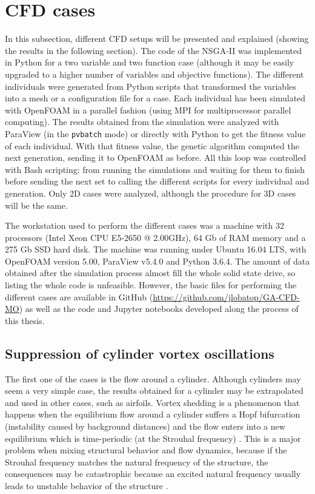 \newpage

\section{CFD cases}

In this subsection, different CFD setups will be presented and explained (showing the results in the following section). The code of the NSGA-II was implemented in Python for a two variable and two function case (although it may be easily upgraded to a higher number of variables and objective functions). The different individuals were generated from Python scripts that transformed the variables into a mesh or a configuration file for a case. Each individual has been simulated with OpenFOAM in a parallel fashion (using MPI for multiprocessor parallel computing). The results obtained from the simulation were analyzed with ParaView (in the \texttt{pvbatch} mode) or directly with Python to get the fitness value of each individual. With that fitness value, the genetic algorithm computed the next generation, sending it to OpenFOAM as before. All this loop was controlled with Bash scripting: from running the simulations and waiting for them to finish before sending the next set to calling the different scripts for every individual and generation. Only 2D cases were analyzed, although the procedure for 3D cases will be the same.

The workstation used to perform the different cases was a machine with 32 processors (Intel Xeon CPU E5-2650 @ 2.00GHz), 64 Gb of RAM memory and a 275 Gb SSD hard disk. The machine was running under Ubuntu 16.04 LTS, with OpenFOAM version 5.00, ParaView v5.4.0 and Python 3.6.4. The amount of data obtained after the simulation process almost fill the whole solid state drive, so listing the whole code is unfeasible. However, the basic files for performing the different cases are available in GitHub (\url{https://github.com/jlobatop/GA-CFD-MO}) as well as the code and Jupyter notebooks developed along the process of this thesis. 

\subsection{Suppression of cylinder vortex oscillations}

The first one of the cases is the flow around a cylinder. Although cylinders may seem a very simple case, the results obtained for a cylinder may be extrapolated and used in other cases, such as airfoils. Vortex shedding is a phenomenon that happens when the equilibrium flow around a cylinder suffers a Hopf bifurcation (instability caused by background distances) and the flow enters into a new equilibrium which is time-periodic (at the Strouhal frequency) \cite{sengupta2010dynamical}. This is a major problem when mixing structural behavior and flow dynamics, because if the Strouhal frequency matches the natural frequency of the structure, the consequences may be catastrophic because an excited natural frequency usually leads to unstable behavior of the structure \cite{green2006failure}.

